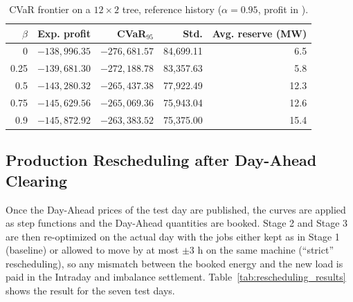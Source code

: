 \documentclass[journal]{IEEEtran}
\begin{document}
\begin{table}[t]
\caption{CVaR frontier on a $12\times2$ tree, reference history ($\alpha=0.95$, profit in \texteuro).}
\label{tab:frontier}
\centering
\small
\begin{tabular}{@{}rrrrr@{}}
\toprule
$\beta$ & \textbf{Exp. profit} & \textbf{CVaR$_{95}$} & \textbf{Std.} & \textbf{Avg. reserve (MW)} \\
\midrule
0 & $-138{,}996.35$ & $-276{,}681.57$ & 84,699.11 & 6.5 \\
0.25 & $-139{,}681.30$ & $-272{,}188.78$ & 83,357.63 & 5.8 \\
0.5 & $-143{,}280.32$ & $-265{,}437.38$ & 77,922.49 & 12.3 \\
0.75 & $-145{,}629.56$ & $-265{,}069.36$ & 75,943.04 & 12.6 \\
0.9 & $-145{,}872.92$ & $-263{,}383.52$ & 75,375.00 & 15.4 \\
\bottomrule
\end{tabular}
\end{table}

\subsection{Production Rescheduling after Day-Ahead Clearing}
Once the Day-Ahead prices of the test day are published, the curves are applied as step functions and the Day-Ahead quantities are booked. Stage 2 and Stage 3 are then re-optimized on the actual day with the jobs either kept as in Stage 1 (baseline) or allowed to move by at most $\pm3$ h on the same machine (``strict'' rescheduling), so any mismatch between the booked energy and the new load is paid in the Intraday and imbalance settlement. Table~\ref{tab:rescheduling_results} shows the result for the seven test days.
\end{document}
